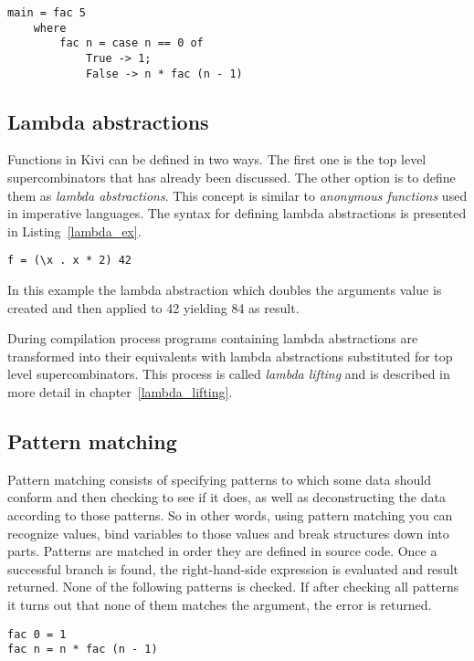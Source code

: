 \documentclass[a4paper]{report}
\begin{document}
\begin{lstlisting}[label=factorial_where_ex,caption={Factorial function using \texttt{where}.}]
main = fac 5
    where
        fac n = case n == 0 of
            True -> 1;
            False -> n * fac (n - 1)
\end{lstlisting}

\subsection{Lambda abstractions}
Functions in Kivi can be defined in two ways. The first one is the top level
supercombinators that has already been discussed. The other option is to define
them as \textit{lambda abstractions}. This concept is similar to \textit{anonymous
functions} used in imperative languages. The syntax for defining lambda
abstractions is presented in Listing~\ref{lambda_ex}.

\begin{lstlisting}[label=lambda_ex,caption={Lambda abstraction}]
f = (\x . x * 2) 42
\end{lstlisting}

In this example the lambda abstraction which doubles the arguments value is
created and then applied to 42 yielding 84 as result.

During compilation process programs containing lambda abstractions are
transformed into their equivalents with lambda abstractions substituted for top
level supercombinators. This process is called \textit{lambda lifting} and is
described in more detail in chapter~\ref{lambda_lifting}.

\subsection{Pattern matching}

Pattern matching consists of specifying patterns to which some data should
conform and then checking to see if it does, as well as deconstructing the data
according to those patterns. So in other words, using pattern matching you can
recognize values, bind variables to those values and break structures down into
parts.
Patterns are matched in order they are defined in source code. Once a
successful branch is found, the right-hand-side expression is evaluated and
result returned. None of the following patterns is checked. If after checking
all patterns it turns out that none of them matches the argument, the error is
returned.

\begin{lstlisting}[label=pattern_matching_ex,caption={Factorial using pattern matching.}]
fac 0 = 1
fac n = n * fac (n - 1)
\end{lstlisting}
\end{document}
